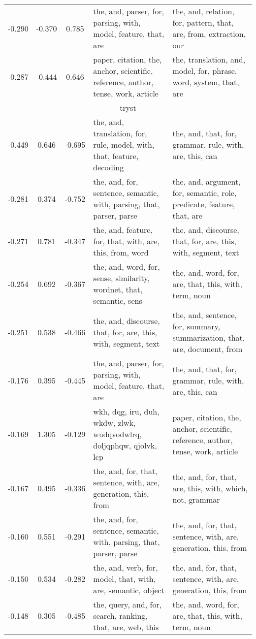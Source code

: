 \begin{tabular}{cccp{5cm}p{5cm}}
-0.290 & -0.370 & 0.785 & the, and, parser, for, parsing, with, model, feature, that, are & the, and, relation, for, pattern, that, are, from, extraction, our \\
-0.287 & -0.444 & 0.646 & paper, citation, the, anchor, scientific, reference, author, tense, work, article & the, translation, and, model, for, phrase, word, system, that, are \\
\midrule
\multicolumn{5}{c}{tryst}\\
-0.449 & 0.646 & -0.695 & the, and, translation, for, rule, model, with, that, feature, decoding & the, and, that, for, grammar, rule, with, are, this, can \\
-0.281 & 0.374 & -0.752 & the, and, for, sentence, semantic, with, parsing, that, parser, parse & the, and, argument, for, semantic, role, predicate, feature, that, are \\
-0.271 & 0.781 & -0.347 & the, and, feature, for, that, with, are, this, from, word & the, and, discourse, that, for, are, this, with, segment, text \\
-0.254 & 0.692 & -0.367 & the, and, word, for, sense, similarity, wordnet, that, semantic, sens & the, and, word, for, are, that, this, with, term, noun \\
-0.251 & 0.538 & -0.466 & the, and, discourse, that, for, are, this, with, segment, text & the, and, sentence, for, summary, summarization, that, are, document, from \\
-0.176 & 0.395 & -0.445 & the, and, parser, for, parsing, with, model, feature, that, are & the, and, that, for, grammar, rule, with, are, this, can \\
-0.169 & 1.305 & -0.129 & wkh, dqg, iru, duh, wkdw, zlwk, wudqvodwlrq, doljqphqw, qjolvk, lcp & paper, citation, the, anchor, scientific, reference, author, tense, work, article \\
-0.167 & 0.495 & -0.336 & the, and, for, that, sentence, with, are, generation, this, from & the, and, for, that, are, this, with, which, not, grammar \\
-0.160 & 0.551 & -0.291 & the, and, for, sentence, semantic, with, parsing, that, parser, parse & the, and, for, that, sentence, with, are, generation, this, from \\
-0.150 & 0.534 & -0.282 & the, and, verb, for, model, that, with, are, semantic, object & the, and, for, that, sentence, with, are, generation, this, from \\
-0.148 & 0.305 & -0.485 & the, query, and, for, search, ranking, that, are, web, this & the, and, word, for, are, that, this, with, term, noun \\

\end{tabular}
